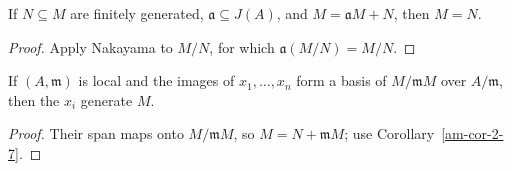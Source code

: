 \begin{corollary}
\label{am-cor-2-7}
\uses{}
If $N\subseteq M$ are finitely generated, $\mathfrak{a}\subseteq J(A)$, and
$M=\mathfrak{a}M+N$, then $M=N$.
\end{corollary}
\begin{proof}
Apply Nakayama to $M/N$, for which $\mathfrak{a}(M/N)=M/N$.
\end{proof}
\begin{proposition}
\label{am-prop-2-8}
\uses{}
If $(A,\mathfrak{m})$ is local and the images of $x_1,\ldots,x_n$ form a basis
of $M/\mathfrak{m}M$ over $A/\mathfrak{m}$, then the $x_i$ generate $M$.
\end{proposition}
\begin{proof}
Their span maps onto $M/\mathfrak{m}M$, so $M=N+\mathfrak{m}M$; use
Corollary~\ref{am-cor-2-7}.
\end{proof}

